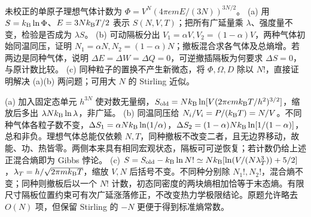 \begin{exercise}
未校正的单原子理想气体计数为 $\Phi=V^N(4\pi e m E/(3N))^{3N/2}$。
(a) 用 $S=k_{\mathrm B}\ln\Phi$、$E=3Nk_{\mathrm B} T/2$ 表示 $S(N,V,T)$；把所有广延量乘 $\lambda$、强度量不变，检验是否成为 $\lambda S$。
(b) 可动隔板分出 $V_1=\alpha V,V_2=(1-\alpha)V$，两种气体初始同温同压，证明 $N_1=\alpha N,N_2=(1-\alpha)N$；撤板混合求各气体及总熵增。若两边是同种气体，说明 $\Delta E=\Delta W=\Delta Q=0$，可逆撤插隔板为何要求 $\Delta S=0$，与原计数比较。
(c) 同种粒子的置换不产生新微态，将 $\Phi,\Omega,D$ 除以 $N!$，直接证明解决 (a)(b) 两问题；可用大 $N$ 的 Stirling 近似。
\end{exercise}
\begin{solution}
(a) 加入固定态单元 $h^{3N}$ 使对数无量纲，$S_{\rm old}=Nk_{\mathrm B}\ln[V(2\pi emk_{\mathrm B} T/h^2)^{3/2}]$，缩放后多出 $\lambda Nk_{\mathrm B}\ln\lambda$，非广延。
(b) 同温同压给 $N_i/V_i=P/(k_{\mathrm B} T)=N/V$。不同种气体各粒子数不变，$\Delta S_1=\alpha Nk_{\mathrm B}\ln(1/\alpha)$，$\Delta S_2=(1-\alpha)Nk_{\mathrm B}\ln[1/(1-\alpha)]$，总和非负。理想气体总能仅依赖 $N,T$，同种撤板不改变二者，且无边界移动，故能、功、热皆零。两侧本来具有相同宏观状态，隔板可可逆恢复；若计数仍给上述正混合熵即为 Gibbs 悖论。
(c) $S=S_{\rm old}-k_{\mathrm B}\ln N!\simeq Nk_{\mathrm B}[\ln(V/(N\lambda_T^3))+5/2]$，$\lambda_T=h/\sqrt{2\pi mk_{\mathrm B} T}$，缩放 $V,N$ 后括号不变。不同种分别除 $N_1!,N_2!$，混合熵不变；同种则撤板后以一个 $N!$ 计数，初态同密度的两块熵相加恰等于末态熵。有限尺寸隔板位置约束可有次广延涨落修正，不改变热力学极限结论。原题允许略去 $O(N)$ 项，但保留 Stirling 的 $-N$ 更便于得到标准熵常数。
\end{solution}

